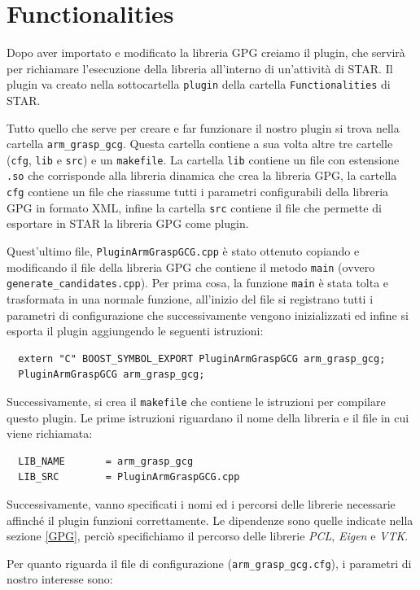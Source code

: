\documentclass{report}
\begin{document}
\section{Functionalities}
Dopo aver importato e modificato la libreria GPG creiamo il plugin, che servirà per richiamare l'esecuzione della libreria all'interno di un'attività di STAR. Il plugin va creato nella sottocartella \texttt{plugin} della cartella \texttt{Functionalities} di STAR. \par
Tutto quello che serve per creare e far funzionare il nostro plugin si trova nella cartella \texttt{arm\_grasp\_gcg}. Questa cartella contiene a sua volta altre tre cartelle (\texttt{cfg}, \texttt{lib} e \texttt{src}) e un \texttt{makefile}. La cartella \texttt{lib} contiene un file con estensione \texttt{.so} che corrisponde alla libreria dinamica che crea la libreria GPG, la cartella \texttt{cfg} contiene un file che riassume tutti i parametri configurabili della libreria GPG in formato XML, infine la cartella \texttt{src} contiene il file che permette di esportare in STAR la libreria GPG come plugin. \par
Quest'ultimo file, \texttt{PluginArmGraspGCG.cpp} è stato ottenuto copiando e modificando il file della libreria GPG che contiene il metodo \texttt{main} (ovvero \texttt{generate\_candidates.cpp}). Per prima cosa, la funzione \texttt{main} è stata tolta e trasformata in una normale funzione, all'inizio del file si registrano tutti i parametri di configurazione che successivamente vengono inizializzati ed infine si esporta il plugin aggiungendo le seguenti istruzioni: 
\begin{verbatim}
  extern "C" BOOST_SYMBOL_EXPORT PluginArmGraspGCG arm_grasp_gcg;
  PluginArmGraspGCG arm_grasp_gcg;
\end{verbatim}
\indent Successivamente, si crea il \texttt{makefile} che contiene le istruzioni per compilare questo plugin. Le prime istruzioni riguardano il nome della libreria e il file in cui viene richiamata:
\begin{verbatim}
  LIB_NAME       = arm_grasp_gcg
  LIB_SRC        = PluginArmGraspGCG.cpp
\end{verbatim} 
Successivamente, vanno specificati i nomi ed i percorsi delle librerie necessarie affinché il plugin funzioni correttamente. Le dipendenze sono quelle indicate nella sezione \ref{GPG}, perciò specifichiamo il percorso delle librerie \textit{PCL}, \textit{Eigen} e \textit{VTK}. \par
Per quanto riguarda il file di configurazione (\texttt{arm\_grasp\_gcg.cfg}), i parametri di nostro interesse sono:
\end{document}

